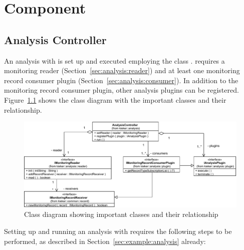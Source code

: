 % 


\chapter{\KiekerAnalysisPart{} Component}\label{chap:componentsAnalysis}


\section{Analysis Controller}\label{sec:analysis:controller}

An analysis with \KiekerAnalysisPart{} is set up and executed employing %
the class . %
\KiekerAnalysisPart{} requires a monitoring reader %
(Section~\ref{sec:analysis:reader}) and at least %
one monitoring record consumer plugin (Section~\ref{sec:analysis:consumer}). %
In addition to the monitoring record consumer plugin, %
other analysis plugins can be registered. %
Figure~\ref{fig:analysisController:classdiagram} shows the class diagram %
with the important \KiekerAnalysisPart{} classes and their relationship. %

\begin{figure}[h]\centering
\includegraphics[scale=0.65]{images/kieker_AnalysisControlleruserguide-modified}
\caption{Class diagram showing important \KiekerAnalysisPart{} classes and their relationship}
\label{fig:analysisController:classdiagram}
\end{figure}

\noindent Setting up and running an analysis with \KiekerAnalysisPart{} requires the %
following steps to be performed, as described in Section~\ref{sec:example:analysis} already:\\

